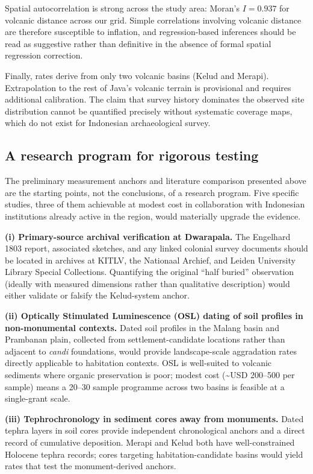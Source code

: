 \documentclass[12pt,a4paper]{article}
\begin{document}
Spatial autocorrelation is strong across the study area: Moran's $I = 0.937$ for volcanic distance across our grid. Simple correlations involving volcanic distance are therefore susceptible to inflation, and regression-based inferences should be read as suggestive rather than definitive in the absence of formal spatial regression correction.

Finally, rates derive from only two volcanic basins (Kelud and Merapi). Extrapolation to the rest of Java's volcanic terrain is provisional and requires additional calibration. The claim that survey history dominates the observed site distribution cannot be quantified precisely without systematic coverage maps, which do not exist for Indonesian archaeological survey.

\subsection{A research program for rigorous testing}
\label{sec:research_program}

The preliminary measurement anchors and literature comparison presented above are the starting points, not the conclusions, of a research program. Five specific studies, three of them achievable at modest cost in collaboration with Indonesian institutions already active in the region, would materially upgrade the evidence.

\textbf{(i) Primary-source archival verification at Dwarapala.} The Engelhard 1803 report, associated sketches, and any linked colonial survey documents should be located in archives at KITLV, the Nationaal Archief, and Leiden University Library Special Collections. Quantifying the original ``half buried'' observation (ideally with measured dimensions rather than qualitative description) would either validate or falsify the Kelud-system anchor.

\textbf{(ii) Optically Stimulated Luminescence (OSL) dating of soil profiles in non-monumental contexts.} Dated soil profiles in the Malang basin and Prambanan plain, collected from settlement-candidate locations rather than adjacent to \textit{candi} foundations, would provide landscape-scale aggradation rates directly applicable to habitation contexts. OSL is well-suited to volcanic sediments where organic preservation is poor; modest cost (\textasciitilde USD 200--500 per sample) means a 20--30 sample programme across two basins is feasible at a single-grant scale.

\textbf{(iii) Tephrochronology in sediment cores away from monuments.} Dated tephra layers in soil cores provide independent chronological anchors and a direct record of cumulative deposition. Merapi and Kelud both have well-constrained Holocene tephra records; cores targeting habitation-candidate basins would yield rates that test the monument-derived anchors.
\end{document}
